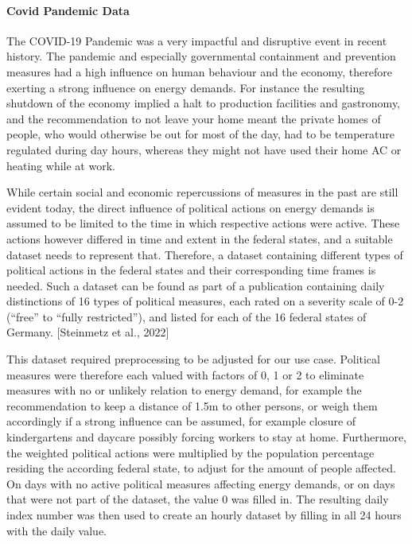 \documentclass[a4paper]{article}
\begin{document}
    \paragraph{Covid Pandemic Data}\label{covid-pandemic-data}

The COVID-19 Pandemic was a very impactful and disruptive event in
recent history. The pandemic and especially governmental containment and
prevention measures had a high influence on human behaviour and the
economy, therefore exerting a strong influence on energy demands. For
instance the resulting shutdown of the economy implied a halt to
production facilities and gastronomy, and the recommendation to not
leave your home meant the private homes of people, who would otherwise
be out for most of the day, had to be temperature regulated during day
hours, whereas they might not have used their home AC or heating while
at work.

While certain social and economic repercussions of measures in the past
are still evident today, the direct influence of political actions on
energy demands is assumed to be limited to the time in which respective
actions were active. These actions however differed in time and extent
in the federal states, and a suitable dataset needs to represent that.
Therefore, a dataset containing different types of political actions in
the federal states and their corresponding time frames is needed. Such a
dataset can be found as part of a publication containing daily
distinctions of 16 types of political measures, each rated on a severity
scale of 0-2 (``free'' to ``fully restricted''), and listed for each of
the 16 federal states of Germany. {[}Steinmetz et al., 2022{]}

This dataset required preprocessing to be adjusted for our use case.
Political measures were therefore each valued with factors of 0, 1 or 2
to eliminate measures with no or unlikely relation to energy demand, for
example the recommendation to keep a distance of 1.5m to other persons,
or weigh them accordingly if a strong influence can be assumed, for
example closure of kindergartens and daycare possibly forcing workers to
stay at home. Furthermore, the weighted political actions were
multiplied by the population percentage residing the according federal
state, to adjust for the amount of people affected. On days with no
active political measures affecting energy demands, or on days that were
not part of the dataset, the value 0 was filled in. The resulting daily
index number was then used to create an hourly dataset by filling in all
24 hours with the daily value.
\end{document}
